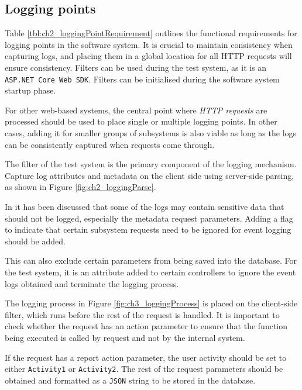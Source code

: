 \clearpage

\subsection{Logging points}
Table \ref{tbl:ch2_loggingPointRequirement} outlines the functional requirements for logging points in the software system. It is crucial to maintain consistency when capturing logs, and placing them in a global location for all HTTP requests will ensure consistency. Filters can be used during the test system, as it is an \texttt{ ASP.NET Core Web SDK}. Filters can be initialised during the software system startup phase.\par For other web-based systems, the central point where \textit{HTTP requests} are processed should be used to place single or multiple logging points. In other cases, adding it for smaller groups of subsystems is also viable as long as the logs can be consistently captured when requests come through. \par The filter of the test system is the primary component of the logging mechanism. Capture log attributes and metadata on the client side using server-side parsing, as shown in Figure \ref{fig:ch2_loggingParse}. \par In  it has been discussed that some of the logs may contain sensitive data that should not be logged, especially the metadata request parameters. Adding a flag to indicate that certain subsystem requests need to be ignored for event logging should be added.\par This can also exclude certain parameters from being saved into the database. For the test system, it is an attribute added to certain controllers to ignore the event logs obtained and terminate the logging process. \par The logging process in Figure \ref{fig:ch3_loggingProcess} is placed on the client-side filter, which runs before the rest of the request is handled. It is important to check whether the request has an action parameter to ensure that the function being executed is called by request and not by the internal system.\par If the request has a report action parameter, the user activity should be set to either \texttt{Activity1} or \texttt{Activity2}. The rest of the request parameters should be obtained and formatted as a \texttt{JSON} string to be stored in the database.

\clearpage

